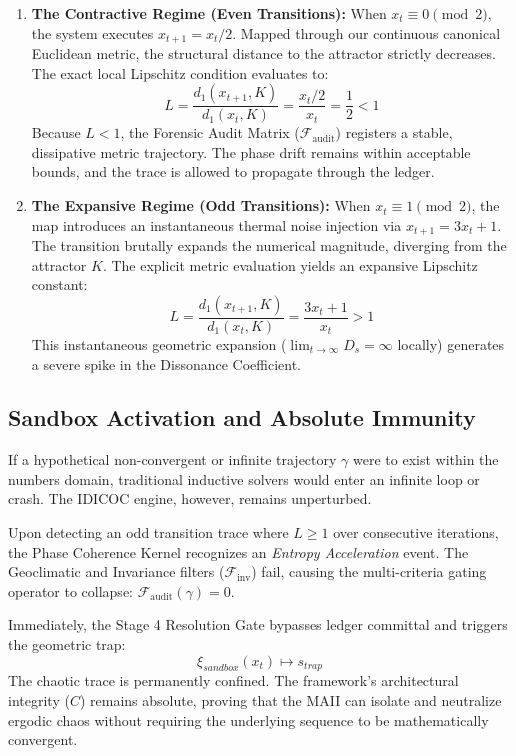 \documentclass[11pt,a4paper]{article}
\begin{document}
\begin{enumerate}
    \item \textbf{The Contractive Regime (Even Transitions):} 
    When $x_t \equiv 0 \pmod 2$, the system executes $x_{t+1} = x_t / 2$. Mapped through our continuous canonical Euclidean metric, the structural distance to the attractor strictly decreases. The exact local Lipschitz condition evaluates to:
    \begin{equation}
        L = \frac{d_1(x_{t+1}, K)}{d_1(x_t, K)} = \frac{x_t / 2}{x_t} = \frac{1}{2} < 1
    \end{equation}
    Because $L < 1$, the Forensic Audit Matrix ($\mathcal{F}_{\text{audit}}$) registers a stable, dissipative metric trajectory. The phase drift remains within acceptable bounds, and the trace is allowed to propagate through the ledger.

    \item \textbf{The Expansive Regime (Odd Transitions):} 
    When $x_t \equiv 1 \pmod 2$, the map introduces an instantaneous thermal noise injection via $x_{t+1} = 3x_t + 1$. The transition brutally expands the numerical magnitude, diverging from the attractor $K$. The explicit metric evaluation yields an expansive Lipschitz constant:
    \begin{equation}
        L = \frac{d_1(x_{t+1}, K)}{d_1(x_t, K)} = \frac{3x_t + 1}{x_t} > 1
    \end{equation}
    This instantaneous geometric expansion ($\lim_{t \to \infty} D_s = \infty$ locally) generates a severe spike in the Dissonance Coefficient.
\end{enumerate}

\subsection{Sandbox Activation and Absolute Immunity}
If a hypothetical non-convergent or infinite trajectory $\gamma$ were to exist within the numbers domain, traditional inductive solvers would enter an infinite loop or crash. The IDICOC engine, however, remains unperturbed. 

Upon detecting an odd transition trace where $L \ge 1$ over consecutive iterations, the Phase Coherence Kernel recognizes an \textit{Entropy Acceleration} event. The Geoclimatic and Invariance filters ($\mathcal{F}_{\text{inv}}$) fail, causing the multi-criteria gating operator to collapse: $\mathcal{F}_{\text{audit}}(\gamma) = 0$. 

Immediately, the Stage 4 Resolution Gate bypasses ledger committal and triggers the geometric trap:
\begin{equation}
    \xi_{sandbox}(x_t) \mapsto s_{trap}
\end{equation}
The chaotic trace is permanently confined. The framework's architectural integrity ($C$) remains absolute, proving that the MAII can isolate and neutralize ergodic chaos without requiring the underlying sequence to be mathematically convergent.
\end{document}
